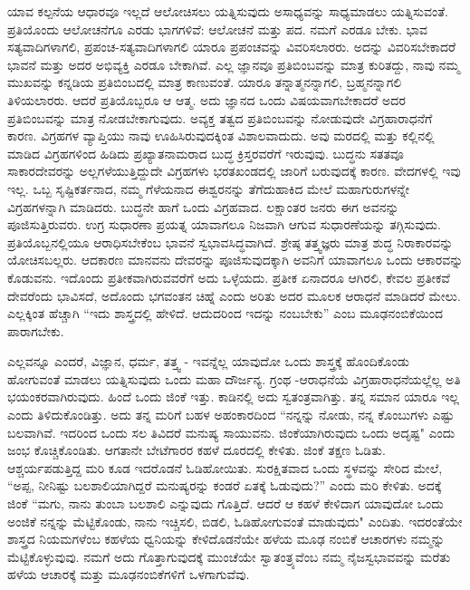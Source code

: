 ಯಾವ ಕಲ್ಪನೆಯ ಆಧಾರವೂ ಇಲ್ಲದೆ ಆಲೋಚಿಸಲು ಯತ್ನಿಸುವುದು ಅಸಾಧ್ಯವನ್ನು ಸಾಧ್ಯಮಾಡಲು ಯತ್ನಿಸುವಂತೆ. ಪ್ರತಿಯೊಂದು ಆಲೋಚನೆಗೂ ಎರಡು ಭಾಗಗಳಿವೆ: ಆಲೋಚನೆ ಮತ್ತು ಪದ. ನಮಗೆ ಎರಡೂ ಬೇಕು. ಭಾವ ಸತ್ಯವಾದಿಗಳಾಗಲಿ, ಪ್ರಪಂಚ-ಸತ್ಯವಾದಿಗಳಾಗಲಿ ಯಾರೂ ಪ್ರಪಂಚವನ್ನು ವಿವರಿಸಲಾರರು. ಅದನ್ನು ವಿವರಿಸಬೇಕಾದರೆ ಭಾವನೆ ಮತ್ತು ಅದರ ಅಭಿವ್ಯಕ್ತಿ ಎರಡೂ ಬೇಕಾಗಿವೆ. ಎಲ್ಲ ಜ್ಞಾನವೂ ಪ್ರತಿಬಿಂಬವನ್ನು ಮಾತ್ರ ಕುರಿತದ್ದು, ನಾವು ನಮ್ಮ ಮುಖವನ್ನು ಕನ್ನಡಿಯ ಪ್ರತಿಬಿಂಬದಲ್ಲಿ ಮಾತ್ರ ಕಾಣುವಂತೆ. ಯಾರೂ ತನ್ನಾತ್ಮನನ್ನಾಗಲಿ, ಬ್ರಹ್ಮನನ್ನಾಗಲಿ ತಿಳಿಯಲಾರರು. ಆದರೆ ಪ್ರತಿಯೊಬ್ಬರೂ ಆ ಆತ್ಮ. ಅದು ಜ್ಞಾನದ ಒಂದು ವಿಷಯವಾಗಬೇಕಾದರೆ ಅದರ ಪ್ರತಿಬಿಂಬವನ್ನು ಮಾತ್ರ ನೋಡಬೇಕಾಗುವುದು. ಅವ್ಯಕ್ತ ತತ್ವದ ಪ್ರತಿಬಿಂಬವನ್ನು ನೋಡುವುದೇ ವಿಗ್ರಹಾರಾಧನೆಗೆ ಕಾರಣ. ವಿಗ್ರಹಗಳ ವ್ಯಾಪ್ತಿಯು ನಾವು ಊಹಿಸಿರುವುದಕ್ಕಿಂತ ವಿಶಾಲವಾದುದು. ಅವು ಮರದಲ್ಲಿ ಮತ್ತು ಕಲ್ಲಿನಲ್ಲಿ ಮಾಡಿದ ವಿಗ್ರಹಗಳಿಂದ ಹಿಡಿದು ಪ್ರಖ್ಯಾತನಾಮರಾದ ಬುದ್ಧ ಕ್ರಿಸ್ತರವರೆಗೆ ಇರುವುವು. ಬುದ್ಧನು ಸತತವೂ ಸಾಕಾರದೇವರನ್ನು ಅಲ್ಲಗಳೆಯುತ್ತಿದ್ದುದೇ ವಿಗ್ರಹಗಳು ಭರತಖಂಡದಲ್ಲಿ ಜಾರಿಗೆ ಬರುವುದಕ್ಕೆ ಕಾರಣ. ವೇದಗಳಲ್ಲಿ ಇವು ಇಲ್ಲ. ಒಬ್ಬ ಸೃಷ್ಟಿಕರ್ತನಾದ, ನಮ್ಮ ಗೆಳೆಯನಾದ ಈಶ್ವರನನ್ನು ತೆಗೆದುಹಾಕಿದ ಮೇಲೆ ಮಹಾಗುರುಗಳನ್ನೇ ವಿಗ್ರಹಗಳನ್ನಾಗಿ ಮಾಡಿದರು. ಬುದ್ಧನೇ ಹಾಗೆ ಒಂದು ವಿಗ್ರಹವಾದ. ಲಕ್ಷಾಂತರ ಜನರು ಈಗ ಅವನನ್ನು ಪೂಜಿಸುತ್ತಿರುವರು. ಉಗ್ರ ಸುಧಾರಣಾ ಪ್ರಯತ್ನ ಯಾವಾಗಲೂ ನಿಜವಾಗಿ ಆಗುವ ಸುಧಾರಣೆಯನ್ನು ತಗ್ಗಿಸುವುದು. ಪ್ರತಿಯೊಬ್ಬನಲ್ಲಿಯೂ ಆರಾಧಿಸಬೇಕೆಂಬ ಭಾವನೆ ಸ್ವಭಾವಸಿದ್ಧವಾಗಿದೆ. ಶ್ರೇಷ್ಠ ತತ್ತ್ವಜ್ಞರು ಮಾತ್ರ ಶುದ್ಧ ನಿರಾಕಾರವನ್ನು ಯೋಚಿಸಬಲ್ಲರು. ಆದಕಾರಣ ಮಾನವನು ದೇವರನ್ನು ಪೂಜಿಸುವುದಕ್ಕಾಗಿ ಅವನಿಗೆ ಯಾವಾಗಲೂ ಒಂದು ಆಕಾರವನ್ನು ಕೊಡುವನು. ಇದೊಂದು ಪ್ರತೀಕವಾಗಿರುವವರೆಗೆ ಅದು ಒಳ್ಳೆಯದು. ಪ್ರತೀಕ ಏನಾದರೂ ಆಗಿರಲಿ, ಕೇವಲ ಪ್ರತೀಕವೆ ದೇವರೆಂದು ಭಾವಿಸದೆ, ಅದೊಂದು ಭಗವಂತನ ಚಿಹ್ನೆ ಎಂದು ಅರಿತು ಅದರ ಮೂಲಕ ಆರಾಧನೆ ಮಾಡಿದರೆ ಮೇಲು. ಎಲ್ಲಕ್ಕಿಂತ ಹೆಚ್ಚಾಗಿ “ಇದು ಶಾಸ್ತ್ರದಲ್ಲಿ ಹೇಳಿದೆ. ಆದುದರಿಂದ ಇದನ್ನು ನಂಬಬೇಕು'' ಎಂಬ ಮೂಢನಂಬಿಕೆಯಿಂದ ಪಾರಾಗಬೇಕು.

ಎಲ್ಲವನ್ನೂ ಎಂದರೆ, ವಿಜ್ಞಾನ, ಧರ್ಮ, ತತ್ತ್ವ - ಇವನ್ನೆಲ್ಲ ಯಾವುದೋ ಒಂದು ಶಾಸ್ತ್ರಕ್ಕೆ ಹೊಂದಿಕೊಂಡು ಹೋಗುವಂತೆ ಮಾಡಲು ಯತ್ನಿಸುವುದು ಒಂದು ಮಹಾ ದೌರ್ಜನ್ಯ. ಗ್ರಂಥ -ಆರಾಧನೆಯೆ ವಿಗ್ರಹಾರಾಧನೆಯಲ್ಲೆಲ್ಲ ಅತಿ ಭಯಂಕರವಾಗಿರುವುದು. ಹಿಂದೆ ಒಂದು ಜಿಂಕೆ ಇತ್ತು. ಕಾಡಿನಲ್ಲಿ ಅದು ಸ್ವತಂತ್ರವಾಗಿತ್ತು. ತನ್ನ ಸಮಾನ ಯಾರೂ ಇಲ್ಲ ಎಂದು ತಿಳಿದುಕೊಂಡಿತ್ತು. ಅದು ತನ್ನ ಮರಿಗೆ ಬಹಳ ಅಹಂಕಾರದಿಂದ “ನನ್ನನ್ನು ನೋಡು, ನನ್ನ ಕೊಂಬುಗಳು ಎಷ್ಟು ಬಲವಾಗಿವೆ. ಇದರಿಂದ ಒಂದು ಸಲ ತಿವಿದರೆ ಮನುಷ್ಯ ಸಾಯುವನು. ಜಿಂಕೆಯಾಗಿರುವುದು ಒಂದು ಅದೃಷ್ಟ" ಎಂದು ಜಂಭ ಕೊಚ್ಚಿಕೊಂಡಿತು. ಆಗತಾನೇ ಬೇಟೆಗಾರರ ಕಹಳೆ ದೂರದಲ್ಲಿ ಕೇಳಿತು. ಜಿಂಕೆ ತಕ್ಷಣ ಓಡಿತು. ಆಶ್ಚರ್ಯಪಡುತ್ತಿದ್ದ ಮರಿ ಕೂಡ ಇದರೊಡನೆ ಓಡಿಹೋಯಿತು. ಸುರಕ್ಷಿತವಾದ ಒಂದು ಸ್ಥಳವನ್ನು ಸೇರಿದ ಮೇಲೆ, “ಅಪ್ಪ, ನೀನಿಷ್ಟು ಬಲಶಾಲಿಯಾಗಿದ್ದರೆ ಮನುಷ್ಯರನ್ನು ಕಂಡರೆ ಏತಕ್ಕೆ ಓಡುವುದು?'' ಎಂದು ಮರಿ ಕೇಳಿತು. ಅದಕ್ಕೆ ಜಿಂಕೆ “ಮಗು, ನಾನು ತುಂಬಾ ಬಲಶಾಲಿ ಎನ್ನುವುದು ಗೊತ್ತಿದೆ. ಆದರೆ ಆ ಕಹಳೆ ಕೇಳಿದಾಗ ಯಾವುದೋ ಒಂದು ಅಂಜಿಕೆ ನನ್ನನ್ನು ಮೆಟ್ಟಿಕೊಂಡು, ನಾನು ಇಚ್ಚಿಸಲಿ, ಬಿಡಲಿ, ಓಡಿಹೋಗುವಂತೆ ಮಾಡುವುದು" ಎಂದಿತು. ಇದರಂತೆಯೇ ಶಾಸ್ತ್ರದ ನಿಯಮಗಳೆಂಬ ಕಹಳೆಯ ಧ್ವನಿಯನ್ನು ಕೇಳಿದೊಡನೆಯೇ ಹಳೆಯ ಮೂಢ ನಂಬಿಕೆ ಆಚಾರಗಳು ನಮ್ಮನ್ನು ಮೆಟ್ಟಿಕೊಳ್ಳುವುವು. ನಮಗೆ ಅದು ಗೊತ್ತಾಗುವುದಕ್ಕೆ ಮುಂಚೆಯೇ ಸ್ವಾತಂತ್ರ್ಯವೆಂಬ ನಮ್ಮ ನೈಜಸ್ವಭಾವವನ್ನು ಮರೆತು ಹಳೆಯ ಆಚಾರಕ್ಕೆ ಮತ್ತು ಮೂಢನಂಬಿಕೆ\-ಗಳಿಗೆ ಒಳಗಾಗುವೆವು.

